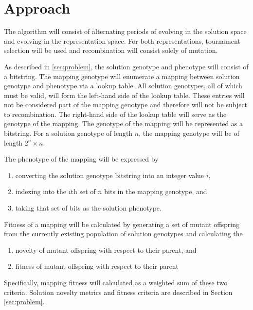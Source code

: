 \section{Approach}

The algorithm will consist of alternating periods of evolving in the solution space and evolving in the representation space.
For both representations, tournament selection will be used and recombination will consist solely of mutation.

As described in \ref{sec:problem}, the solution genotype and phenotype will consist of a bitstring.
The mapping genotype will enumerate a mapping between solution genotype and phenotype via a lookup table.
All solution genotypes, all of which must be valid, will form the left-hand side of the lookup table.
These entries will not be considered part of the mapping genotype and therefore will not be subject to recombination.
The right-hand side of the lookup table will serve as the genotype of the mapping.
The genotype of the mapping will be represented as a bitstring.
For a solution genotype of length $n$, the mapping genotype will be of length
$2^n \times n$.

The phenotype of the mapping will be expressed by
\begin{enumerate}
\item converting the solution genotype bitstring into an integer value $i$,
\item indexing into the $i$th set of $n$ bits in the mapping genotype, and
\item taking that set of bits as the solution phenotype.
\end{enumerate}

Fitness of a mapping will be calculated by generating a set of mutant offspring from the currently existing population of solution genotypes and calculating the
\begin{enumerate}
\item novelty of mutant offspring with respect to their parent, and
\item fitness of mutant offspring with respect to their parent
\end{enumerate}
Specifically, mapping fitness will calculated as a weighted sum of these two criteria.
Solution novelty metrics and fitness criteria are described in Section \ref{sec:problem}.
